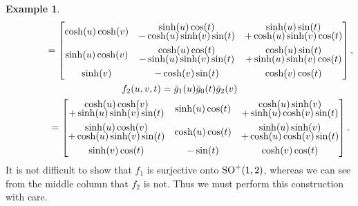 \documentclass[10pt,a4paper]{amsart}
\numberwithin{equation}{section}
\theoremstyle{definition}
\newtheorem{exmpl}[teo]{Example}
\begin{document}
\begin{exmpl}
\begin{gather*}
\hphantom{f_1(u,v,t)}{}
=
\begin{bmatrix}
\cosh(u) \cosh(v) & \begin{array}{@{}c@{}} \sinh(u) \cos(t) \vspace{-1mm}\\ - \cosh(u) \sinh(v) \sin(t)\end{array}   &
\begin{array}{@{}c@{}} \sinh(u) \sin(t) \vspace{-1mm}\\ + \cosh(u) \sinh(v) \cos(t)\end{array}
\vspace{1mm}\\
\sinh(u) \cosh(v) & \begin{array}{@{}c@{}}\cosh(u) \cos(t)\vspace{-1mm}\\- \sinh(u) \sinh(v) \sin(t)\end{array} &
\begin{array}{@{}c@{}}\cosh(u) \sin(t)\vspace{-1mm}\\ + \sinh(u) \sinh(v) \cos(t)\end{array}
\vspace{1mm}\\
\sinh(v) & -\cosh(v) \sin(t) & \cosh(v) \cos(t)
\end{bmatrix},
\\
f_2(u,v,t)=\bar{g}_1(u) \bar{g}_0(t) \bar{g}_2(v)
\\
\hphantom{f_2(u,v,t)}{}
=
\begin{bmatrix}
\begin{array}{@{}c@{}} \cosh(u) \cosh(v)\vspace{-1mm}\\+ \sinh(u) \sinh(v) \sin(t)\end{array} & \sinh(u) \cos(t) &
 \begin{array}{@{}c@{}} \cosh(u) \sinh(v)\vspace{-1mm}\\+ \sinh(u) \cosh(v) \sin(t)\end{array}
\vspace{1mm}\\
\begin{array}{@{}c@{}} \sinh(u) \cosh(v)\vspace{-1mm}\\+ \cosh(u) \sinh(v) \sin(t)\end{array}
 & \cosh(u) \cos(t) & \begin{array}{@{}c@{}} \sinh(u) \sinh(v)\vspace{-1mm}\\+ \cosh(u) \cosh(v) \sin(t)\end{array}
\vspace{1mm}\\
\sinh(v) \cos(t) & -\sin(t) & \cosh(v) \cos(t)
\end{bmatrix}.
\end{gather*}
It is not dif\/f\/icult to show that $f_1$ is surjective onto ${\rm SO}^+(1,2)$, whereas we can see from the middle column
that $f_2$ is not.
Thus we must perform this construction with care.


\end{exmpl}
\end{document}
